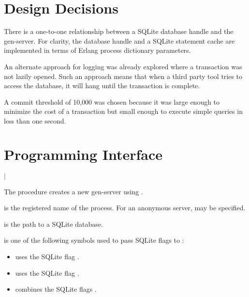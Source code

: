\section {Design Decisions}

There is a one-to-one relationship between a SQLite database handle
and the  gen-server. For clarity, the database handle and a
SQLite statement cache are implemented in terms of Erlang process
dictionary parameters.

An alternate approach for logging was already explored where a
transaction was not lazily opened. Such an approach means that when a
third party tool tries to access the database, it will hang until the
transaction is complete.

A commit threshold of 10,000 was chosen because it was large enough to
minimize the cost of a transaction but small enough to execute simple
queries in less than one second.

\section {Programming Interface}

\begin{procedure}
\end{procedure}
\returns{}
 $|$

The  procedure creates a new 
gen-server using .

 is the registered name of the process. For an anonymous
server,  may be specified.

 is the path to a SQLite database.

 is one of the following symbols used to pass SQLite flags
to :

\antipar\begin{itemize}

\item {} uses the SQLite flag
  .

\item {} uses the SQLite flag
  .

\item {} combines the SQLite flags .
\end{itemize}

